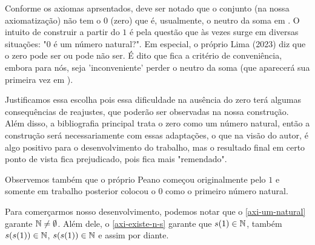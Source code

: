 \documentclass[../main.tex]{subfiles}
\begin{document}
Conforme os axiomas aprsentados, deve ser notado que o conjunto \N (na nossa axiomatização) não tem o $0$ (zero) que é, usualmente, o neutro da soma em \N. O intuito de construir a partir do $1$ é pela questão que às vezes surge em diversas situações: "$0$ é um número natural?". Em especial, o próprio Lima (2023) diz que o zero pode ser ou pode não ser. É dito que fica a critério de conveniência, embora para nós, seja 'inconveniente' perder o neutro da soma (que aparecerá sua primeira vez em \Z). 

Justificamos essa escolha pois essa dificuldade na ausência do zero terá algumas consequências de reajustes, que poderão ser observadas na nossa construção. Além disso, a bibliografia principal trata o zero como um número natural, então a construção será necessariamente com essas adaptações, o que na visão do autor, é algo positivo para o desenvolvimento do trabalho, mas o resultado final em certo ponto de vista fica prejudicado, pois fica mais "remendado".

Observemos também que o próprio Peano começou originalmente pelo $1$ e somente em trabalho posterior colocou o $0$ como o primeiro número natural.

Para comerçarmos nosso desenvolvimento, podemos notar que o \cref{axi-um-natural} garante $\mathbb{N} \neq \emptyset $. Além dele, o \cref{axi-existe-n-s} garante que $s(1) \in \mathbb{N}$, também $s(s(1)) \in \mathbb{N}$, $s(s(1)) \in \mathbb{N}$ e assim por diante.
\end{document}
